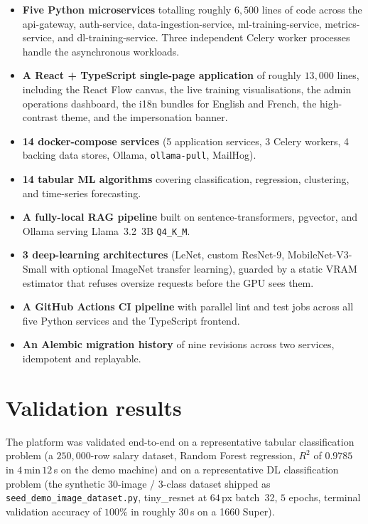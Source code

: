 \documentclass[12pt, a4paper]{report}
\begin{document}
\begin{itemize}
    \item \textbf{Five Python microservices} totalling roughly
        $6{,}500$ lines of code across the api-gateway,
        auth-service, data-ingestion-service, ml-training-service,
        metrics-service, and dl-training-service. Three
        independent Celery worker processes handle the
        asynchronous workloads.
    \item \textbf{A React + TypeScript single-page application} of
        roughly $13{,}000$ lines, including the React Flow
        canvas, the live training visualisations, the admin
        operations dashboard, the i18n bundles for English and
        French, the high-contrast theme, and the impersonation
        banner.
    \item \textbf{14 docker-compose services} (5 application
        services, 3 Celery workers, 4 backing data stores,
        Ollama, \texttt{ollama-pull}, MailHog).
    \item \textbf{14 tabular ML algorithms} covering
        classification, regression, clustering, and time-series
        forecasting.
    \item \textbf{A fully-local RAG pipeline} built on
        sentence-transformers, pgvector, and Ollama serving
        Llama~3.2~3B \texttt{Q4\_K\_M}.
    \item \textbf{3 deep-learning architectures} (LeNet, custom
        ResNet-9, MobileNet-V3-Small with optional ImageNet
        transfer learning), guarded by a static VRAM estimator
        that refuses oversize requests before the GPU sees them.
    \item \textbf{A GitHub Actions CI pipeline} with parallel
        lint and test jobs across all five Python services and
        the TypeScript frontend.
    \item \textbf{An Alembic migration history} of nine
        revisions across two services, idempotent and
        replayable.
\end{itemize}

\section*{Validation results}

The platform was validated end-to-end on a representative tabular
classification problem (a $250{,}000$-row salary dataset, Random
Forest regression, $R^2$ of $0.9785$ in $4$\,min\,$12$\,s on the
demo machine) and on a representative DL classification problem
(the synthetic 30-image / 3-class dataset shipped as
\texttt{seed\_demo\_image\_dataset.py}, tiny\_resnet at $64$\,px
batch~32, $5$ epochs, terminal validation accuracy of $100\%$ in
roughly $30$\,s on a 1660 Super).
\end{document}
